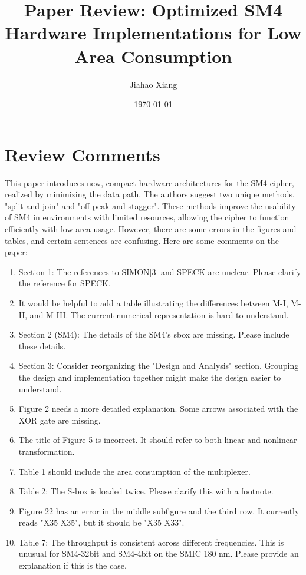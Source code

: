 \documentclass{article}
\title{Paper Review: Optimized SM4 Hardware Implementations for Low Area Consumption}
\author{Jiahao Xiang}
\date{\today}
\begin{document}
\maketitle

\section{Review Comments}

This paper introduces new, compact hardware architectures for the SM4 cipher, realized by minimizing the data path. The authors suggest two unique methods, "split-and-join" and "off-peak and stagger". These methods improve the usability of SM4 in environments with limited resources, allowing the cipher to function efficiently with low area usage. However, there are some errors in the figures and tables, and certain sentences are confusing. Here are some comments on the paper:

\begin{enumerate}
    \item Section 1: The references to SIMON[3] and SPECK are unclear. Please clarify the reference for SPECK.
    \item It would be helpful to add a table illustrating the differences between M-I, M-II, and M-III. The current numerical representation is hard to understand.
    \item Section 2 (SM4): The details of the SM4's sbox are missing. Please include these details.
    \item Section 3: Consider reorganizing the "Design and Analysis" section. Grouping the design and implementation together might make the design easier to understand.
    \item Figure 2 needs a more detailed explanation. Some arrows associated with the XOR gate are missing.
    \item The title of Figure 5 is incorrect. It should refer to both linear and nonlinear transformation.
    \item Table 1 should include the area consumption of the multiplexer.
    \item Table 2: The S-box is loaded twice. Please clarify this with a footnote.
    \item Figure 22 has an error in the middle subfigure and the third row. It currently reads "X35 X35", but it should be "X35 X33".
    \item Table 7: The throughput is consistent across different frequencies. This is unusual for SM4-32bit and SM4-4bit on the SMIC 180 nm. Please provide an explanation if this is the case.
\end{enumerate}

\end{document}
